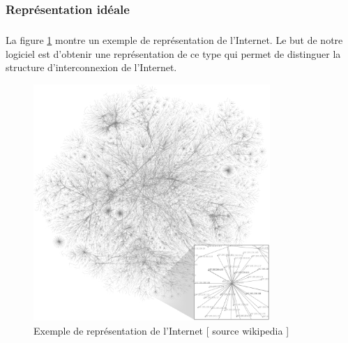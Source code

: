 \subsubsection{Représentation idéale}
\subparagraph{}
La figure \ref{ideal} montre un exemple de représentation de l'Internet. Le but de notre logiciel est d'obtenir une représentation de ce type qui permet de distinguer la structure d'interconnexion de l'Internet.

\begin{figure}[H]
\begin{center}
        \includegraphics[width=0.8\textwidth]{./schema/Internet_map_1024_transparent.png}
\caption{Exemple de représentation de l'Internet [ source wikipedia ] }
\label{ideal}
\end{center}
\end{figure}

